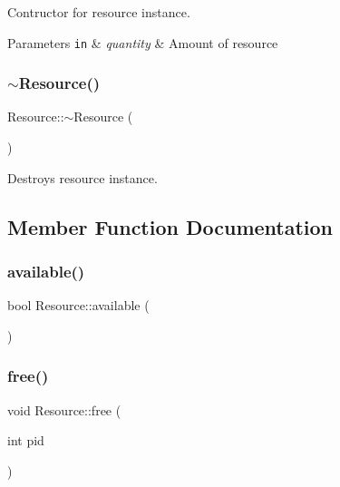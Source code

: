 Contructor for resource instance. 


\begin{DoxyParams}[1]{Parameters}
\mbox{\tt in}  & {\em quantity} & Amount of resource \\
\hline
\end{DoxyParams}
\hypertarget{class_resource_a0e5ec475e2601bdb33644468e86f6f10}{}\label{class_resource_a0e5ec475e2601bdb33644468e86f6f10} 
\subsubsection{\texorpdfstring{$\sim$\+Resource()}{~Resource()}}
{\footnotesize\ttfamily Resource\+::$\sim$\+Resource (\begin{DoxyParamCaption}{ }\end{DoxyParamCaption})}



Destroys resource instance. 



\subsection{Member Function Documentation}
\hypertarget{class_resource_aeab97fd70f8ce65b0e883444642c3321}{}\label{class_resource_aeab97fd70f8ce65b0e883444642c3321} 
\subsubsection{\texorpdfstring{available()}{available()}}
{\footnotesize\ttfamily bool Resource\+::available (\begin{DoxyParamCaption}{ }\end{DoxyParamCaption})\hspace{0.3cm}{\ttfamily [inline]}}

\hypertarget{class_resource_a1b67c452867b328a40434ad1a94d0afd}{}\label{class_resource_a1b67c452867b328a40434ad1a94d0afd} 
\subsubsection{\texorpdfstring{free()}{free()}}
{\footnotesize\ttfamily void Resource\+::free (\begin{DoxyParamCaption}\item[{int}]{pid }\end{DoxyParamCaption})}



